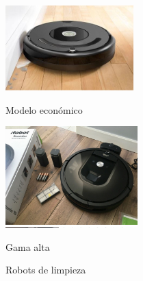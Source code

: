 \begin{figure}[ht!]
	\centering
	\begin{minipage}{0.3\linewidth}
		\centering
		\includegraphics[width=\linewidth]{figs/gama-baja.png}
		\caption*{\centering Modelo económico }%
	\end{minipage}
	\hspace{3cm}
	\begin{minipage}{0.3\linewidth}
		\centering
		\includegraphics[width=\linewidth]{figs/gama-alta.png}
		\caption*{\centering Gama alta} %
	\end{minipage}
	\caption{Robots de limpieza}
	\label{fig:roblimpieza}
\end{figure}


